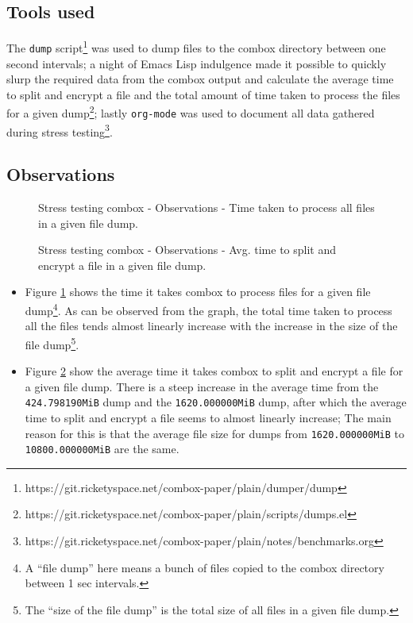 \subsection{Tools used}\label{4-st-tu}

The \verb+dump+ script\footnote{https://git.ricketyspace.net/combox-paper/plain/dumper/dump} was used to dump files to
the combox directory between one second intervals; a night of Emacs
Lisp indulgence made it possible to quickly slurp the required data
from the combox output and calculate the average time to split and
encrypt a file and the total amount of time taken to process the files
for a given dump\footnote{https://git.ricketyspace.net/combox-paper/plain/scripts/dumps.el}; lastly \verb+org-mode+ was
used to document all data gathered during stress
testing\footnote{https://git.ricketyspace.net/combox-paper/plain/notes/benchmarks.org}.

\subsection{Observations}\label{4-st-o}

\begin{figure}[h]
\centering

\caption{Stress testing combox - Observations - Time taken to process
  all files in a given file dump.}
\label{fig:4-st-tt}
\end{figure}

\begin{figure}[h]
\centering

\caption{Stress testing combox - Observations - Avg. time to split and
  encrypt a file in a given file dump.}
\label{fig:4-st-atsae}
\end{figure}


\begin{itemize}
\item Figure \ref{fig:4-st-tt} shows the time it takes combox to
  process files for a given file dump\footnote{A ``file dump'' here
    means a bunch of files copied to the combox directory between 1
    sec intervals.}. As can be observed from the graph, the total time
  taken to process all the files tends almost linearly increase with
  the increase in the size of the file dump\footnote{The ``size of the
    file dump'' is the total size of all files in a given file dump.}.
\item Figure \ref{fig:4-st-atsae} show the average time it takes
  combox to split and encrypt a file for a given file dump. There is a
  steep increase in the average time from the \verb+424.798190MiB+
  dump and the \verb+1620.000000MiB+ dump, after which the average
  time to split and encrypt a file seems to almost linearly increase;
  The main reason for this is that the average file size for dumps
  from \verb+1620.000000MiB+ to \verb+10800.000000MiB+ are the same.
\end{itemize}

